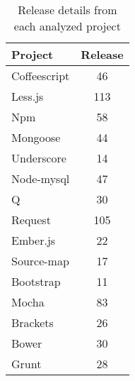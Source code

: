 \begin{table*}[!hbt]
    \begin{center}
        \caption{Release details from each analyzed project}
        \label{tab:evolution_overview}
        \begin{tabular}{l| c }
            \toprule
            \textbf{Project}  & \textbf{Release} \\ \midrule              
            Coffeescript    & 46  \\
            Less.js         & 113 \\
            Npm             & 58  \\
            Mongoose        & 44  \\
            Underscore      & 14  \\
            Node-mysql      & 47  \\
            Q               & 30  \\
            Request         & 105 \\
            Ember.js        & 22  \\
            Source-map      & 17  \\
            Bootstrap       & 11  \\
            Mocha           & 83  \\
            Brackets        & 26  \\
            Bower           & 30  \\
            Grunt           & 28  \\  \bottomrule
        \end{tabular}
    \end{center}
\end{table*}